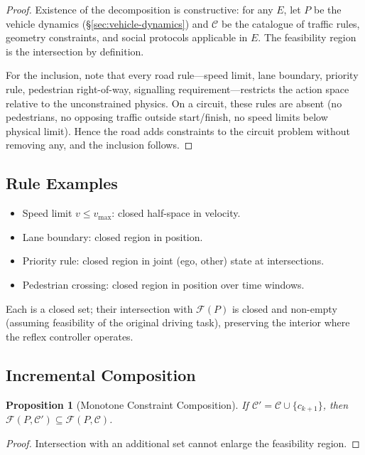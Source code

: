 \documentclass[11pt,twocolumn]{article}
\newtheorem{proposition}[theorem]{Proposition}
\theoremstyle{definition}
\theoremstyle{remark}
\newcommand{\Feas}{\mathcal{F}}
\providecommand{\cC}{\mathcal{C}}
\begin{document}
\begin{proof}
Existence of the decomposition is constructive: for any $E$, let $P$ be the vehicle dynamics (\S\ref{sec:vehicle-dynamics}) and $\cC$ be the catalogue of traffic rules, geometry constraints, and social protocols applicable in $E$. The feasibility region is the intersection by definition.

For the inclusion, note that every road rule---speed limit, lane boundary, priority rule, pedestrian right-of-way, signalling requirement---restricts the action space relative to the unconstrained physics. On a circuit, these rules are absent (no pedestrians, no opposing traffic outside start/finish, no speed limits below physical limit). Hence the road adds constraints to the circuit problem without removing any, and the inclusion follows.
\end{proof}

\subsection{Rule Examples}

\begin{itemize}[leftmargin=*,itemsep=2pt]
\item Speed limit $v \le v_{\max}$: closed half-space in velocity.
\item Lane boundary: closed region in position.
\item Priority rule: closed region in joint (ego, other) state at intersections.
\item Pedestrian crossing: closed region in position over time windows.
\end{itemize}

Each is a closed set; their intersection with $\Feas(P)$ is closed and non-empty (assuming feasibility of the original driving task), preserving the interior where the reflex controller operates.

\subsection{Incremental Composition}

\begin{proposition}[Monotone Constraint Composition]\label{prop:mono}
If $\cC' = \cC \cup \{c_{k+1}\}$, then $\Feas(P, \cC') \subseteq \Feas(P, \cC)$.
\end{proposition}

\begin{proof}
Intersection with an additional set cannot enlarge the feasibility region.
\end{proof}
\end{document}
